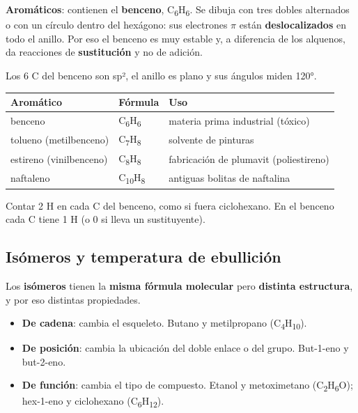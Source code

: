  

\textbf{Aromáticos}: contienen el \textbf{benceno}, C\textsubscript{6}H\textsubscript{6}. Se dibuja con tres dobles alternados o con un círculo dentro del hexágono: sus electrones $\pi$ están \textbf{deslocalizados} en todo el anillo. Por eso el benceno es muy estable y, a diferencia de los alquenos, da reacciones de \textbf{sustitución} y no de adición.

 

Los 6 C del benceno son sp², el anillo es plano y sus ángulos miden 120°.

  
\begin{center}\small
\begin{tabularx}{\linewidth}{@{}>{\raggedright\arraybackslash\hsize=0.97\hsize}X>{\raggedright\arraybackslash\hsize=0.42\hsize}X>{\raggedright\arraybackslash\hsize=1.61\hsize}X@{}}
\toprule
\textbf{Aromático} & \textbf{Fórmula} & \textbf{Uso} \\
\midrule
benceno & C\textsubscript{6}H\textsubscript{6} & materia prima industrial (tóxico) \\
tolueno (metilbenceno) & C\textsubscript{7}H\textsubscript{8} & solvente de pinturas \\
estireno (vinilbenceno) & C\textsubscript{8}H\textsubscript{8} & fabricación de plumavit (poliestireno) \\
naftaleno & C\textsubscript{10}H\textsubscript{8} & antiguas bolitas de naftalina \\
\bottomrule
\end{tabularx}
\end{center}
 
\begin{ojo} Contar 2 H en cada C del benceno, como si fuera ciclohexano. En el benceno cada C tiene 1 H (o 0 si lleva un sustituyente).\end{ojo}
\subsection{Isómeros y temperatura de ebullición}
Los \textbf{isómeros} tienen la \textbf{misma fórmula molecular} pero \textbf{distinta estructura}, y por eso distintas propiedades.

 
\begin{itemize}
  \item \textbf{De cadena}: cambia el esqueleto. Butano y metilpropano (C\textsubscript{4}H\textsubscript{10}).
  \item \textbf{De posición}: cambia la ubicación del doble enlace o del grupo. But-1-eno y but-2-eno.
  \item \textbf{De función}: cambia el tipo de compuesto. Etanol y metoximetano (C\textsubscript{2}H\textsubscript{6}O); hex-1-eno y ciclohexano (C\textsubscript{6}H\textsubscript{12}).
\end{itemize}
 
